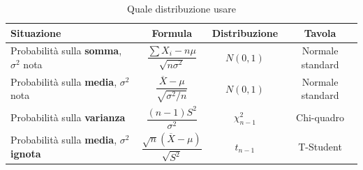 \documentclass{article}  %
\theoremstyle{definition}
\begin{document}
\newpage
\begin{table}[h]
	\centering
	\renewcommand{\arraystretch}{3.5}
	\begin{tabular}{|l|c|c|c|}
		\hline
		\textbf{Situazione}                                          & \textbf{Formula} & \textbf{Distribuzione} & \textbf{Tavola} \\[6pt]
		\hline
		Probabilità sulla \textbf{somma}, $\sigma^2$ nota            &
		$\dfrac{\displaystyle\sum X_i - n\mu}{\sqrt{n\sigma^2}}$     &
		$N(0,1)$                                                     &
		Normale standard                                                                                                           \\[6pt]
		\hline
		Probabilità sulla \textbf{media}, $\sigma^2$ nota            &
		$\dfrac{\overline{X} - \mu}{\sqrt{\sigma^2/n}}$              &
		$N(0,1)$                                                     &
		Normale standard                                                                                                           \\[6pt]
		\hline
		Probabilità sulla \textbf{varianza}                          &
		$\dfrac{(n-1)S^2}{\sigma^2}$                                 &
		$\chi^2_{n-1}$                                               &
		Chi-quadro                                                                                                                 \\[6pt]
		\hline
		Probabilità sulla \textbf{media}, $\sigma^2$ \textbf{ignota} &
		$\dfrac{\sqrt{n}(\overline{X} - \mu)}{\sqrt{S^2}}$           &
		$t_{n-1}$                                                    &
		T-Student                                                                                                                  \\[6pt]
		\hline
	\end{tabular}
	\caption{Quale distribuzione usare}
\end{table}
\newpage
\end{document}
